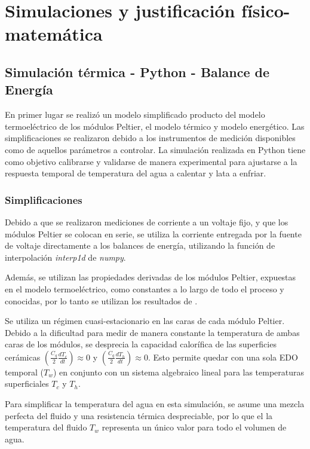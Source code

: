 \documentclass[12pt, a4paper]{article}
\begin{document}
\section{Simulaciones y justificación físico-matemática}
\label{sec:simulaciones}

\subsection{Simulación térmica - Python - Balance de Energía}

En primer lugar se realizó un modelo simplificado producto del modelo termoeléctrico de los módulos Peltier, el modelo térmico y modelo energético. Las simplificaciones se realizaron debido a los instrumentos de medición disponibles como de aquellos parámetros a controlar. La simulación realizada en Python tiene como objetivo calibrarse y validarse de manera experimental para ajustarse a la respuesta temporal de temperatura del agua a calentar y lata a enfriar.

\subsubsection{Simplificaciones}

Debido a que se realizaron mediciones de corriente a un voltaje fijo, y que los módulos Peltier se colocan en serie, se utiliza la corriente entregada por la fuente de voltaje directamente a los balances de energía, utilizando la función de interpolación \textit{interp1d} de \textit{numpy}.

Además, se utilizan las propiedades derivadas de los módulos Peltier, expuestas en el modelo termoeléctrico, como constantes a lo largo de todo el proceso y conocidas, por lo tanto se utilizan los resultados de \textcite{Dymytrov_2017}.

Se utiliza un régimen cuasi-estacionario en las caras de cada módulo Peltier. Debido a la dificultad para medir de manera constante la temperatura de ambas caras de los módulos, se desprecia la capacidad calorífica de las superficies cerámicas $\left(\frac{C_q}{2}\frac{dT_c}{dt}\right) \approx 0$ y $\left(\frac{C_q}{2}\frac{dT_h}{dt}\right) \approx 0$. Esto permite quedar con una sola EDO temporal ($T_w$) en conjunto con un sistema algebraico lineal para las temperaturas superficiales $T_c$ y $T_h$.

Para simplificar la temperatura del agua en esta simulación, se asume una mezcla perfecta del fluido y una resistencia térmica despreciable, por lo que el la temperatura del fluido $T_w$ representa un único valor para todo el volumen de agua. 
\end{document}
